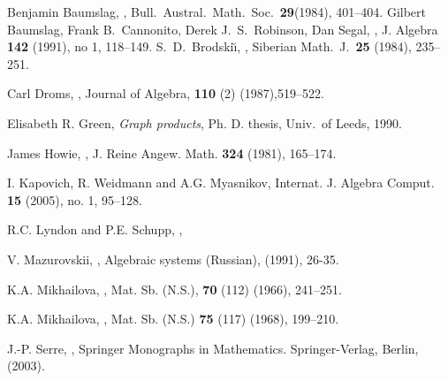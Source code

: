 \documentclass[12pt, a4paper]{amsart}
\theoremstyle{remark}
\theoremstyle{definition}
\begin{document}
\begin{thebibliography}{21}

Benjamin Baumslag,
,
\newblock Bull.\ Austral.\ Math.\ Soc.\ \textbf{29}(1984), 401--404.
\vskip-0.4cm \null
{}
Gilbert Baumslag, Frank B.\ Cannonito, Derek J.\ S.\ Robinson, Dan Segal,
,
\newblock J. Algebra {\bf 142} (1991), no 1, 118--149.
\vskip-0.4cm \null
{}
S.\ D.\ Brodski\u{\i},
,
\newblock Siberian Math.\ J.\ \textbf{25} (1984), 235--251.
\vskip-0.4cm\null 

Carl Droms,
,
\newblock Journal of Algebra, \textbf{110} (2) (1987),519--522.
\vskip-0.4cm \null

Elisabeth R. Green,
\newblock \emph{Graph products},
\newblock Ph. D. thesis, Univ.\ of Leeds, 1990.
\vskip-0.4cm \null

James Howie,
,
\newblock J. Reine Angew. Math.  \textbf{324} (1981), 165--174.
\vskip-0.4cm

I. Kapovich, R. Weidmann and A.G. Myasnikov,
\newblock Internat. J. Algebra Comput. {\bf 15} (2005), no. 1, 95--128. 
\vskip-0.4cm \null

R.C. Lyndon and P.E. Schupp,
,
\vskip-0.4cm \null

V. Mazurovskii,
,
\newblock Algebraic systems (Russian), (1991), 26-35.
\vskip-0.4cm \null

K.A. Mikhailova,
,
\newblock Mat. Sb. (N.S.), \textbf{70} (112) (1966), 241--251.
\vskip-0.4cm \null

K.A. Mikhailova,
,
\newblock Mat. Sb. (N.S.) \textbf{75} (117) (1968), 199--210.
\vskip-0.4cm \null

J.-P. Serre,
,
\newblock Springer Monographs in Mathematics. Springer-Verlag, Berlin, (2003).
\vskip-0.4cm \null

\end{thebibliography}
\end{document}
